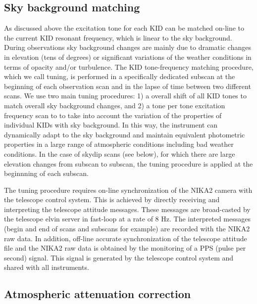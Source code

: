 \documentclass[]{aa} %
\begin{document}
\subsection{Sky background matching}
\label{telsynch}

As discussed above the excitation tone for each KID can be matched on-line to the current KID resonant frequency, which is linear to the sky background. During observations sky background changes are mainly due to dramatic changes in elevation (tens of degrees) or significant variations of the weather conditions in terms of opacity and/or turbulence. The KID tone-frequency matching procedure, which we call tuning, is performed in a specifically dedicated subscan at the beginning of each observation scan and in the lapse of time between two different scans. We use two main tuning procedures: 1) a overall shift of all KID tones to match overall sky background changes, and 2) a tone per tone excitation frequency scan to to take into account the variation of the properties of individual KIDs with sky background. In this way, the instrument can dynamically adapt to the sky background and maintain equivalent photometric properties in a large range of atmospheric conditions including bad weather conditions.
In the case of skydip scans (see below), for which there are large elevation changes from subscan to subscan, the tuning procedure is applied at the beginnning of each subscan.

The tuning procedure requires on-line synchronization of the NIKA2 camera with the telescope control system. This is achieved by directly receiving and interpreting the telescope attitude messages. These messages are broad-casted by the telescope elvin server in fast-loop at a rate of 8 Hz. The interpreted messages (begin and end of scans and subscans for example) are recorded with the NIKA2 raw data. In addition, off-line accurate synchronization of the telescope attitude file and the NIKA2 raw data is obtained by the monitoring of a PPS (pulse per second) signal. This signal is generated by the telescope control system and shared with all instruments.


\subsection{Atmospheric attenuation correction}
\label{Atmospheric attenuation correction}
\end{document}
